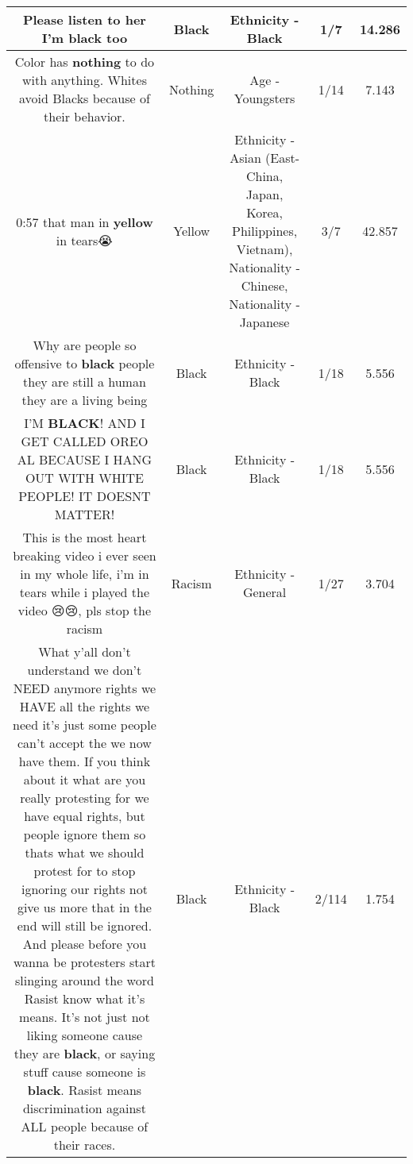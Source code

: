 \documentclass[11pt]{article}
\newlength\mylength
\begin{document}
\begin{center}
\begin{longtable}{|C{.65\mylength}|C{.30\mylength}|C{.12\mylength}|C{.12\mylength}|C{.12\mylength}|}
  \small Please listen to her I'm \textbf{black} too\normalsize   & Black & Ethnicity - Black & 1/7 & 14.286 \\  \hline
  \small Color has \textbf{nothing} to do with anything. Whites avoid Blacks because of their behavior.\normalsize   & Nothing & Age - Youngsters & 1/14 & 7.143 \\  \hline
  \small 0:57 that man in \textbf{y\textbf{e\textbf{llow}}} in tears😭\normalsize   & Yellow & Ethnicity - Asian (East- China, Japan, Korea, Philippines, Vietnam), Nationality - Chinese, Nationality - Japanese & 3/7 & 42.857 \\  \hline
  \small Why are people so offensive to \textbf{black} people they are still a human they are a living being\normalsize   & Black & Ethnicity - Black & 1/18 & 5.556 \\  \hline
  \small I'M \textbf{BLACK}! AND I GET CALLED OREO AL BECAUSE I HANG OUT WITH WHITE PEOPLE! IT DOESNT MATTER!\normalsize   & Black & Ethnicity - Black & 1/18 & 5.556 \\  \hline
  \small This is the most heart breaking video i ever seen in my whole life, i'm in tears while i played the video 😢😢, pls stop the racism\normalsize   & Racism & Ethnicity - General & 1/27 & 3.704 \\  \hline
  \small What y'all don't understand we don't NEED anymore rights we HAVE all the rights we need it's just some people can't accept the we now have them. If you think about it what are you really protesting for we have equal rights, but people ignore them so thats what we should protest for to stop ignoring our rights not give us more that in the end will still be ignored. And please before you wanna be protesters start slinging around the word Rasist know what it's means. It's not just not liking someone cause they are \textbf{black}, or saying stuff cause someone is \textbf{black}. Rasist means discrimination  against ALL people because of their races.\normalsize   & Black & Ethnicity - Black & 2/114 & 1.754 \\  \hline

\end{longtable}
\end{center}
\end{document}
